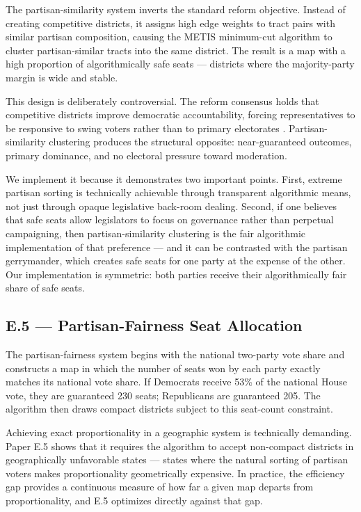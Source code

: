 The partisan-similarity system inverts the standard reform objective.  Instead
of creating competitive districts, it assigns high edge weights to tract pairs
with similar partisan composition, causing the METIS minimum-cut algorithm to
cluster partisan-similar tracts into the same district.  The result is a map
with a high proportion of algorithmically safe seats --- districts where the
majority-party margin is wide and stable.

This design is deliberately controversial.  The reform consensus holds that
competitive districts improve democratic accountability, forcing representatives
to be responsive to swing voters rather than to primary electorates
\citep{masket2015no}.  Partisan-similarity clustering produces the structural
opposite: near-guaranteed outcomes, primary dominance, and no electoral pressure
toward moderation.

We implement it because it demonstrates two important points.  First, extreme
partisan sorting is technically achievable through transparent algorithmic
means, not just through opaque legislative back-room dealing.  Second, if one
believes that safe seats allow legislators to focus on governance rather than
perpetual campaigning, then partisan-similarity clustering is the fair
algorithmic implementation of that preference --- and it can be contrasted with
the partisan gerrymander, which creates safe seats for one party at the expense
of the other.  Our implementation is symmetric: both parties receive their
algorithmically fair share of safe seats.

\subsection{E.5 --- Partisan-Fairness Seat Allocation}

The partisan-fairness system begins with the national two-party vote share and
constructs a map in which the number of seats won by each party exactly matches
its national vote share.  If Democrats receive 53\% of the national House vote,
they are guaranteed 230 seats; Republicans are guaranteed 205.  The algorithm
then draws compact districts subject to this seat-count constraint.

Achieving exact proportionality in a geographic system is technically demanding.
Paper E.5 shows that it requires the algorithm to accept non-compact districts
in geographically unfavorable states --- states where the natural sorting of
partisan voters makes proportionality geometrically expensive.  In practice,
the efficiency gap \citep{stephanopoulos2015partisan} provides a continuous
measure of how far a given map departs from proportionality, and E.5 optimizes
directly against that gap.

